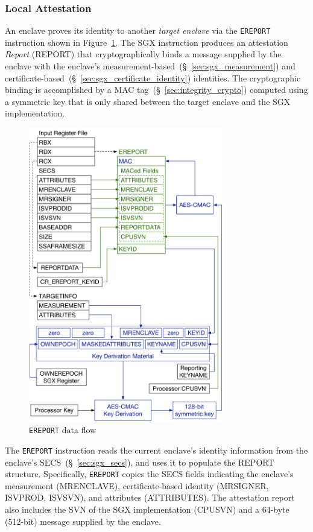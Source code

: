 \subsubsection{Local Attestation}
\label{sec:sgx_ereport}


An enclave proves its identity to another \textit{target enclave} via the
\texttt{EREPORT} instruction shown in Figure~\ref{fig:sgx_ereport}. The SGX
instruction produces an attestation \textit{Report} (REPORT) that
cryptographically binds a message supplied by the enclave with the enclave's
measurement-based~(\S~\ref{sec:sgx_measurement}) and
certificate-based~(\S~\ref{sec:sgx_certificate_identity}) identities. The
cryptographic binding is accomplished by a MAC
tag~(\S~\ref{sec:integrity_crypto}) computed using a symmetric key that is only
shared between the target enclave and the SGX implementation.

\begin{figure}[hbt]
  \centering
  \includegraphics[width=85mm]{figures/sgx_ereport.pdf}
  \caption{
    \texttt{EREPORT} data flow
  }
  \label{fig:sgx_ereport}
\end{figure}

The \texttt{EREPORT} instruction reads the current enclave's identity
information from the enclave's SECS~(\S~\ref{sec:sgx_secs}), and uses it to
populate the REPORT structure. Specifically, \texttt{EREPORT} copies the
SECS fields indicating the enclave's measurement (MRENCLAVE), certificate-based
identity (MRSIGNER, ISVPROD, ISVSVN), and attributes (ATTRIBUTES). The
attestation report also includes the SVN of the SGX implementation (CPUSVN)
and a 64-byte (512-bit) message supplied by the enclave.

